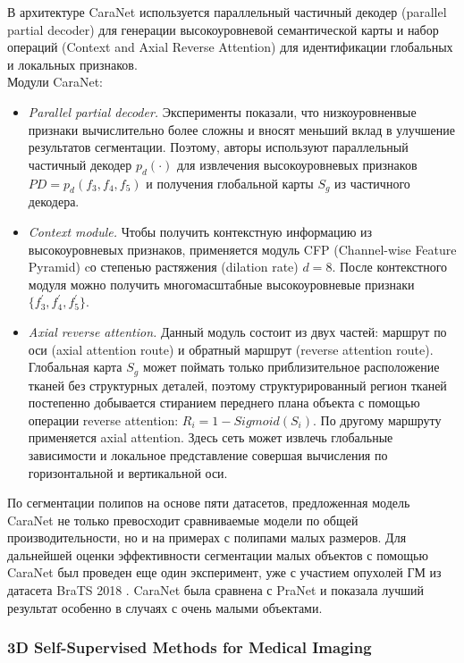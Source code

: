  В архитектуре CaraNet используется параллельный частичный декодер 
(parallel partial decoder) для генерации высокоуровневой семантической
карты и набор операций (Context and Axial Reverse Attention) для 
идентификации глобальных и локальных признаков. 
\\Модули CaraNet:
\begin{itemize}
    \item \textit{Parallel partial decoder.} Эксперименты показали,
    что низкоуровненвые признаки вычислительно более сложны и вносят 
    меньший вклад в улучшение результатов сегментации. Поэтому, авторы 
    используют параллельный частичный декодер \(p_d(\cdot)\) для извлечения 
    высокоуровневых признаков \(PD=p_d(f_3,f_4,f_5)\) и получения глобальной карты 
    \(S_g\) из частичного декодера.
    \item \textit{Context module.} Чтобы получить контекстную информацию из высокоуровневых
    признаков, применяется модуль CFP (Channel-wise Feature Pyramid) cо степенью растяжения 
    (dilation rate) \(d=8\). После контекстного модуля можно получить многомасштабные 
    высокоуровневые признаки \(\{f_{3}^{'}, f_{4}^{'}, f_{5}^{'}\}\).
    \item \textit{Axial reverse attention.} Данный модуль состоит из двух частей:
    маршрут по оси (axial attention route) и обратный маршрут (reverse attention route). Глобальная 
    карта \(S_g\) может поймать только приблизительное расположение тканей без структурных деталей, 
    поэтому структурированный регион тканей постепенно добывается стиранием переднего плана 
    объекта с помощью операции reverse attention: \(R_{i}=1-Sigmoid(S_{i})\). По другому 
    маршруту применяется axial attention. Здесь сеть может извлечь глобальные зависимости и 
    локальное представление совершая вычисления по горизонтальной и вертикальной оси. 
\end{itemize}

По сегментации полипов на основе пяти датасетов, предложенная модель CaraNet не 
только превосходит сравниваемые модели по общей производительности, но и на примерах с 
полипами малых размеров. Для дальнейшей оценки эффективности 
сегментации малых объектов с помощью CaraNet был проведен еще 
один эксперимент, уже с участием опухолей ГМ из датасета BraTS 2018 \cite{BraTS}. 
CaraNet была сравнена с PraNet \cite{PraNet} и показала
лучший результат особенно в случаях с очень малыми объектами.

\subsubsection*{3D Self-Supervised Methods for Medical Imaging}

